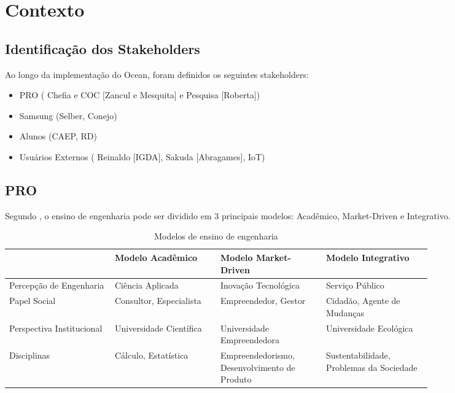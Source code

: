 \chapter{Contexto}
\label{cha:contexto}

\section{Identificação dos Stakeholders}
\label{sec:identificacao_stakeholders}

Ao longo da implementação do Ocean, foram definidos os seguintes stakeholders:

\begin{itemize}
\item PRO ( Chefia e COC [Zancul e Mesquita] e Pesquisa [Roberta])
\item Samsung (Selber, Conejo)
\item Alunos (CAEP, RD)
\item Usuários Externos ( Reinaldo [IGDA], Sakuda [Abragames], IoT)
\end{itemize}

\section{PRO}
\label{sec:con_pro}

Segundo , o ensino de engenharia pode ser dividido em 3 principais modelos: Acadêmico, Market-Driven e Integrativo.

\begin{table}[h]
\begin{center}
\caption{Modelos de ensino de engenharia}
\label{tab:modelos_ensino_tab}
{\def\arraystretch{2}\tabcolsep=10pt
\begin{tabular}{>{\raggedright}p{0.2\linewidth}>{\raggedright\arraybackslash}p{0.2\linewidth}>{\raggedright\arraybackslash}p{0.2\linewidth}>{\raggedright\arraybackslash}p{0.2\linewidth}}
\hline
     & Modelo Acadêmico & Modelo Market-Driven & Modelo Integrativo \\ \hline
     Percepção de Engenharia & Ciência Aplicada & Inovação Tecnológica & Serviço Público \\
     Papel Social & Consultor, Especialista & Empreendedor, Gestor & Cidadão, Agente de Mudanças \\
     Perspectiva Institucional & Universidade Científica & Universidade Empreendedora & Universidade Ecológica  \\
	 Disciplinas & Cálculo, Estatística & Empreendedorismo, Desenvolvimento de Produto & Sustentabilidade, Problemas da Sociedade \\ \hline
\end{tabular}%
}
\end{center}
\end{table}

